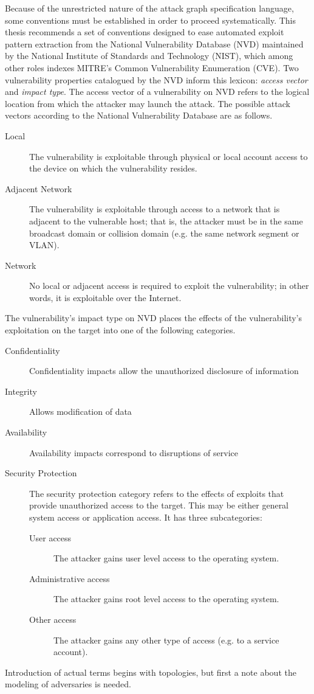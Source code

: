 Because of the unrestricted nature of the attack graph specification language, 
some conventions must be established in order to proceed systematically. This
thesis recommends
a set of conventions designed to ease automated exploit pattern extraction
from the National Vulnerability Database (NVD) maintained by the 
National Institute of Standards and Technology (NIST), which among other roles
indexes MITRE's Common Vulnerability Enumeration (CVE).
Two vulnerability properties catalogued by the NVD inform this lexicon:
\emph{access vector} and \emph{impact type}.
The access vector of a vulnerability on NVD refers to the logical location from
which the attacker may launch the attack. The possible attack vectors according
to the National Vulnerability Database are as follows.
\begin{description}
\item[Local] The vulnerability is exploitable through physical or local account access
    to the device on which the vulnerability resides.
\item[Adjacent Network] The vulnerability is exploitable through access to a network
    that is adjacent to the vulnerable host; that is, the attacker must be in the same
    broadcast domain or collision domain (e.g. the same network segment or VLAN).
\item[Network] No local or adjacent access is required to exploit the vulnerability;
    in other words, it is exploitable over the Internet.
\end{description}
The vulnerability's impact type on NVD places the effects of the vulnerability's
exploitation on the target into one of the following categories.
\begin{description}
\item[Confidentiality] Confidentiality impacts allow the unauthorized disclosure 
    of information
\item[Integrity] Allows modification of data
\item[Availability] Availability impacts correspond to disruptions of service
\item[Security Protection] The security protection category refers to the effects
    of exploits that provide unauthorized access to the target. This may be either
    general system access or application access. It has three subcategories:
    \begin{description}
    \item[User access] The attacker gains user level access to the operating 
        system.
    \item[Administrative access] The attacker gains root level
        access to the operating system.
    \item[Other access] The attacker gains any other type of access (e.g. to
        a service account).
    \end{description}
\end{description}
Introduction of actual terms begins with topologies, but first a note about the modeling
of adversaries is needed. 

